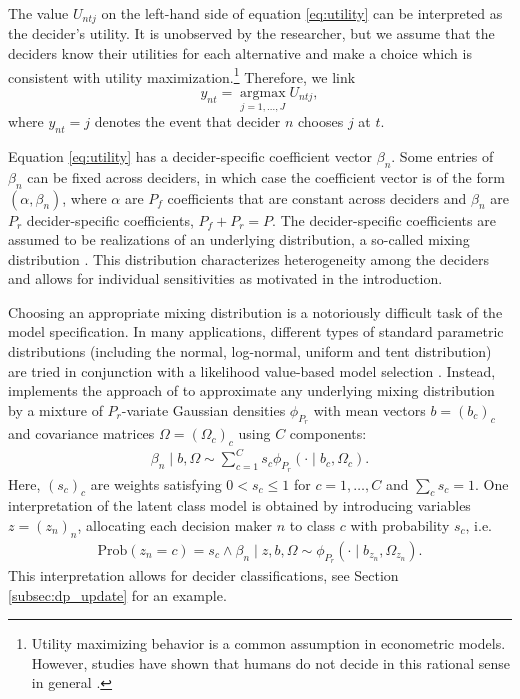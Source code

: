 \documentclass[article,shortnames]{jss}
\begin{document}
The value $U_{ntj}$ on the left-hand side of equation \eqref{eq:utility} can be interpreted as the decider's utility. It is unobserved by the researcher, but we assume that the deciders know their utilities for each alternative and make a choice which is consistent with utility maximization.\footnote{Utility maximizing behavior is a common assumption in econometric models. However, studies have shown that humans do not decide in this rational sense in general \citep{Hewig:2011}.} Therefore, we link
\begin{equation}
   \label{eq:link}
   y_{nt} = \operatorname*{argmax}_{j = 1,\dots,J} U_{ntj},
\end{equation}
where $y_{nt}=j$ denotes the event that decider $n$ chooses $j$ at $t$.

Equation \eqref{eq:utility} has a decider-specific coefficient vector $\beta_n$. Some entries of $\beta_n$ can be fixed across deciders, in which case the coefficient vector is of the form $(\alpha, \beta_n)$, where $\alpha$ are $P_f$ coefficients that are constant across deciders and $\beta_n$ are $P_r$ decider-specific coefficients, $P_f + P_r = P$. The decider-specific coefficients are assumed to be realizations of an underlying distribution, a so-called mixing distribution \citep[Ch.\ 6]{Train:2009}. This distribution characterizes heterogeneity among the deciders and allows for individual sensitivities as motivated in the introduction.

Choosing an appropriate mixing distribution is a notoriously difficult task of the model specification. In many applications, different types of standard parametric distributions (including the normal, log-normal, uniform and tent distribution) are tried in conjunction with a likelihood value-based model selection \citep[pp.\ 136 ff.\ ]{Train:2009}. Instead,  implements the approach of \cite{Oelschlaeger:2020} to approximate any underlying mixing distribution by a mixture of $P_r$-variate Gaussian densities $\phi_{P_r}$ with mean vectors $b=(b_c)_{c}$ and covariance matrices $\Omega=(\Omega_c)_{c}$ using $C$ components:
\begin{align*}
\beta_n\mid b,\Omega \sim \sum_{c=1}^{C} s_c \phi_{P_r} (\cdot \mid b_c,\Omega_c).
\end{align*}
Here, $(s_c)_{c}$ are weights satisfying $0 < s_c\leq 1$ for $c=1,\dots,C$ and $\sum_c s_c=1$. One interpretation of the latent class model is obtained by introducing variables $z=(z_n)_n$, allocating each decision maker $n$ to class $c$ with probability $s_c$, i.e.\
\begin{align*}
\text{Prob}(z_n=c)=s_c \land \beta_n \mid z,b,\Omega \sim \phi_{P_r}(\cdot \mid b_{z_n},\Omega_{z_n}).
\end{align*}
This interpretation allows for decider classifications, see Section \ref{subsec:dp_update} for an example.
\end{document}
